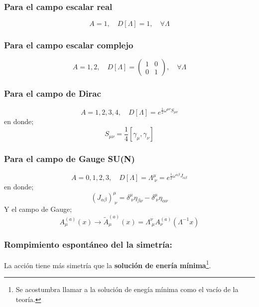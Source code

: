 \documentclass[../main.tex]{subfiles}
\begin{document}
 \subsubsection{Para el campo escalar real}
 \begin{equation}
   A=1,\quad D[\Lambda]=1,\quad \forall \Lambda
  \end{equation}
  \subsubsection{Para el campo escalar complejo}
  \begin{equation}
    A=1,2,\quad D[\Lambda] = \begin{pmatrix}
      1 & 0 \\ 0 & 1 
    \end{pmatrix},\quad \forall \Lambda
   \end{equation}
   \subsubsection{Para el campo de Dirac}
   \begin{equation}
     A=1,2,3,4,\quad D[\Lambda] = e^{\frac{1}{2}\omega^{\mu\nu}S_{\mu\nu}}
    \end{equation}
    en donde;
    \begin{equation}
      S_{\mu\nu} = \frac{1}{4} \left[ \gamma_\mu,\gamma_\nu \right]
     \end{equation}
\subsubsection{Para el campo de Gauge SU(N)}
\begin{equation}
  A=0,1,2,3,\quad D[\Lambda] = \Lambda^{\mu}_{\;\nu} = e^{\frac{1}{2}\omega^{\alpha\beta}J_{\alpha \beta}}
 \end{equation}
 en donde;
 \begin{equation}
   \left( J_{\alpha \beta} \right)^\mu_{\;\nu} = \delta^\mu_{\;\nu}\eta_{ \beta \nu} - \delta^{\mu}_{\;\nu}\eta_{\alpha \nu}
  \end{equation}
  Y el campo de Gauge;
  \begin{equation}
    A^{(a)}_\mu(x) \rightarrow \tilde{A}_{\mu}^{(a)} (x) = \Lambda^{\nu}_{\;\mu}A^{(a)}_\nu(\Lambda^{-1}x)
   \end{equation}
\subsubsection{Rompimiento espontáneo del la simetría:}
La acción tiene más simetría que la \textbf{solución de enería mínima}\footnote{Se acostumbra llamar a la solución de enegía mínima como el vacío de la teoría.}.
\end{document}
